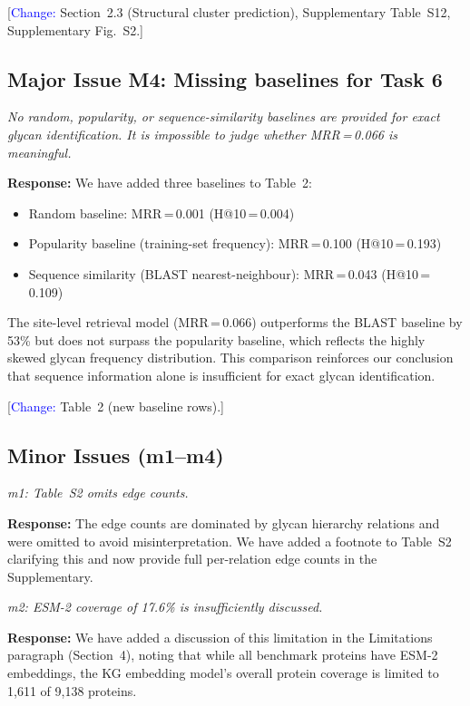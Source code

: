 \documentclass[11pt,a4paper]{article}
\newcommand{\reviewercomment}[1]{\textit{\color{black!70}#1}}
\newcommand{\response}[1]{\textbf{Response:} #1}
\newcommand{\change}[1]{[\textcolor{blue}{Change:} #1]}
\begin{document}
\change{Section~2.3 (Structural cluster prediction), Supplementary Table~S12,
Supplementary Fig.~S2.}

\subsection*{Major Issue M4: Missing baselines for Task 6}

\reviewercomment{No random, popularity, or sequence-similarity baselines are
provided for exact glycan identification. It is impossible to judge whether
MRR\,=\,0.066 is meaningful.}

\response{We have added three baselines to Table~2:
\begin{itemize}[nosep]
  \item Random baseline: MRR\,=\,0.001 (H@10\,=\,0.004)
  \item Popularity baseline (training-set frequency): MRR\,=\,0.100 (H@10\,=\,0.193)
  \item Sequence similarity (BLAST nearest-neighbour): MRR\,=\,0.043 (H@10\,=\,0.109)
\end{itemize}
The site-level retrieval model (MRR\,=\,0.066) outperforms the BLAST baseline
by 53\% but does not surpass the popularity baseline, which reflects the highly
skewed glycan frequency distribution. This comparison reinforces our conclusion
that sequence information alone is insufficient for exact glycan identification.}

\change{Table~2 (new baseline rows).}

\subsection*{Minor Issues (m1--m4)}

\reviewercomment{m1: Table~S2 omits edge counts.}

\response{The edge counts are dominated by glycan hierarchy relations and were
omitted to avoid misinterpretation. We have added a footnote to Table~S2
clarifying this and now provide full per-relation edge counts in the
Supplementary.}

\reviewercomment{m2: ESM-2 coverage of 17.6\% is insufficiently discussed.}

\response{We have added a discussion of this limitation in the Limitations
paragraph (Section~4), noting that while all benchmark proteins have ESM-2
embeddings, the KG embedding model's overall protein coverage is limited to
1,611 of 9,138 proteins.}
\end{document}
